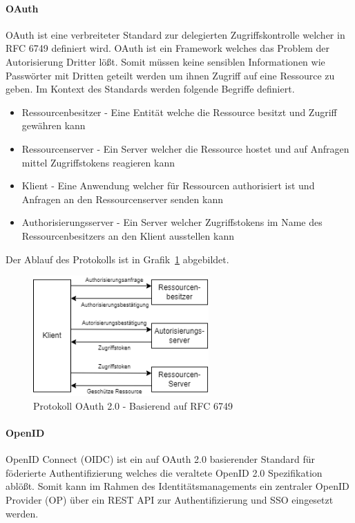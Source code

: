 \documentclass[11pt]{article}
\begin{document}
\paragraph{OAuth}
OAuth ist eine verbreiteter Standard zur delegierten Zugriffskontrolle welcher in RFC 6749 definiert wird. OAuth ist ein Framework welches das Problem der Autorisierung Dritter lößt. Somit müssen keine sensiblen Informationen wie Passwörter mit Dritten geteilt werden um ihnen Zugriff auf eine Ressource zu geben. Im Kontext des Standards werden folgende Begriffe definiert.
\begin{itemize}
  \item Ressourcenbesitzer - Eine Entität welche die Ressource besitzt und Zugriff gewähren kann
  \item Ressourcenserver - Ein Server welcher die Ressource hostet und auf Anfragen mittel Zugriffstokens reagieren kann
  \item Klient - Eine Anwendung welcher für Ressourcen authorisiert ist und Anfragen an den Ressourcenserver senden kann
  \item Authorisierungsserver - Ein Server welcher Zugriffstokens im Name des Ressourcenbesitzers an den Klient ausstellen kann
\end{itemize}
Der Ablauf des Protokolls ist in Grafik~\cref{fig:oauth} abgebildet.~\cite{rfc6749}
\begin{figure}[H]
  \centering
  \includegraphics[width=0.6\textwidth]{assets/oauth.png}
  \caption{Protokoll OAuth 2.0 - Basierend auf RFC 6749}\label{fig:oauth}
\end{figure}
\paragraph{OpenID}
OpenID Connect (OIDC) ist ein auf OAuth 2.0 basierender Standard für föderierte Authentifizierung welches die veraltete OpenID 2.0 Spezifikation ablößt. Somit kann im Rahmen des Identitätsmanagements ein zentraler OpenID Provider (OP) über ein REST API zur Authentifizierung und SSO eingesetzt werden.~\cite{naik2017choice}
\end{document}
